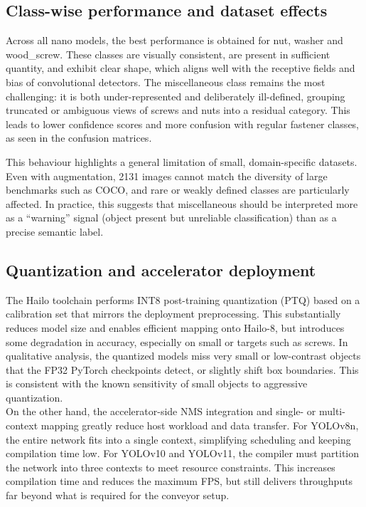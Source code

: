 \documentclass[12pt,a4paper]{report}
\begin{document}
\subsection{Class-wise performance and dataset effects}

Across all nano models, the best performance is obtained for nut, washer and wood\_screw.
These classes are visually consistent, are present in sufficient quantity, and exhibit
clear shape, which aligns well with the receptive fields and bias of convolutional detectors.
The miscellaneous class remains the most challenging: it is both under-represented and
deliberately ill-defined, grouping truncated or ambiguous views of screws and nuts into
a residual category.
This leads to lower confidence scores and more confusion with regular fastener classes,
as seen in the confusion matrices.

This behaviour highlights a general limitation of small, domain-specific datasets.
Even with augmentation, 2131 images cannot match the diversity of large benchmarks such
as COCO, and rare or weakly defined classes are particularly affected.
In practice, this suggests that miscellaneous should be interpreted more as
a “warning” signal (object present but unreliable classification) than as a precise semantic label.

\subsection{Quantization and accelerator deployment}

The Hailo toolchain performs INT8 post-training quantization (PTQ) based on a calibration
set that mirrors the deployment preprocessing.
This substantially reduces model size and enables efficient mapping onto Hailo-8,
but introduces some degradation in accuracy, especially on small or targets such as screws.
In qualitative analysis, the quantized models miss very small or low-contrast objects that
the FP32 PyTorch checkpoints detect, or slightly shift box boundaries.
This is consistent with the known sensitivity of small objects to aggressive quantization. \\

On the other hand, the accelerator-side NMS integration and single- or multi-context
mapping greatly reduce host workload and data transfer.
For YOLOv8n, the entire network fits into a single context, simplifying scheduling
and keeping compilation time low.
For YOLOv10 and YOLOv11, the compiler must partition the network into three contexts
to meet resource constraints.
This increases compilation time and reduces the maximum FPS, but still delivers throughputs
far beyond what is required for the conveyor setup. \\
\end{document}
